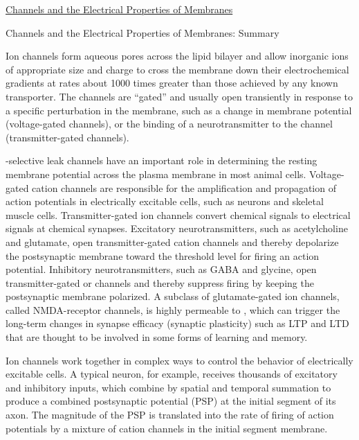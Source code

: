 \documentclass[12pt,letterpaper]{article}
\begin{document}
\begin{secbox}{\hyperlink{11}{Channels and the Electrical Properties of Membranes}}
{    \hypertarget{11.3.r}{}
    \begin{probbox}{Channels and the Electrical Properties of Membranes: Summary}\end{probbox}
        Ion channels form aqueous pores across the lipid bilayer and allow inorganic ions of appropriate size and charge to cross the membrane down their electrochemical gradients at rates about 1000 times greater than those achieved by any known transporter. The channels are “gated” and usually open transiently in response to a specific perturbation in the membrane, such as a change in membrane potential (voltage-gated channels), or the binding of a neurotransmitter to the channel (transmitter-gated channels).\par
        \vspace{12pt}
        -selective leak channels have an important role in determining the resting membrane potential across the plasma membrane in most animal cells.  Voltage-gated cation channels are responsible for the amplification and propagation of action potentials in electrically excitable cells, such as neurons and skeletal muscle cells. Transmitter-gated ion channels convert chemical signals to electrical signals at chemical synapses. Excitatory neurotransmitters, such as acetylcholine and glutamate, open transmitter-gated cation channels and thereby depolarize the postsynaptic membrane toward the threshold level for firing an action potential. Inhibitory neurotransmitters, such as GABA and glycine, open transmitter-gated  or  channels and thereby suppress firing by keeping the postsynaptic membrane polarized. A subclass of glutamate-gated ion channels, called NMDA-receptor channels, is highly permeable to , which can trigger the long-term changes in synapse efficacy (synaptic plasticity) such as LTP and LTD that are thought to be involved in some forms of learning and memory.\par 
        \vspace{12pt}
        Ion channels work together in complex ways to control the behavior of electrically excitable cells. A typical neuron, for example, receives thousands of excitatory and inhibitory inputs, which combine by spatial and temporal summation to produce a combined postsynaptic potential (PSP) at the initial segment of its axon. The magnitude of the PSP is translated into the rate of firing of action potentials by a mixture of cation channels in the initial segment membrane.
}\end{secbox}
\end{document}
